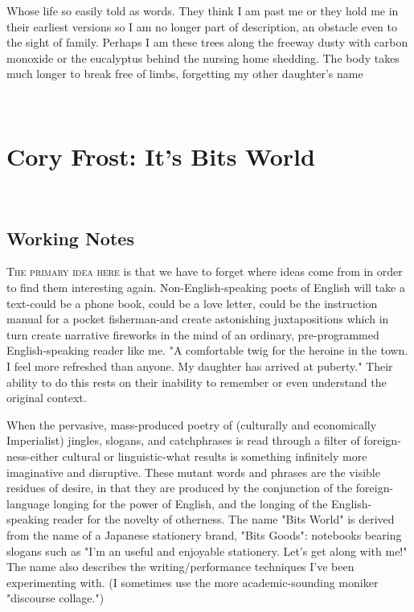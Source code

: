 \documentclass[
]{memoir}
\begin{document}
Whose life so easily told as words. They think I am past me or they hold
me in their earliest versions so I am no longer part of description, an
obstacle even to the sight of family. Perhaps I am these trees along the
freeway dusty with carbon monoxide or the eucalyptus behind the nursing
home shedding. The body takes much longer to break free of limbs,
forgetting my other daughter's name

~

\hypertarget{cory-frost-its-bits-world}{%
\chapter{Cory Frost: It's Bits World}\label{cory-frost-its-bits-world}}

~

\hypertarget{working-notes-2}{%
\section*{Working Notes}\label{working-notes-2}}

\lettrine[lines=3, findent=0em, nindent=0.1em, lhang=0]{T}{he primary idea here}
is that we have to forget where ideas come from in order to find them
interesting again. Non-English-speaking poets of English will take a
text-could be a phone book, could be a love letter, could be the
instruction manual for a pocket fisherman-and create astonishing
juxtapositions which in turn create narrative fireworks in the mind of
an ordinary, pre-programmed English-speaking reader like me. "A
comfortable twig for the heroine in the town. I feel more refreshed than
anyone. My daughter has arrived at puberty." Their ability to do this
rests on their inability to remember or even understand the original
context.

When the pervasive, mass-produced poetry of (culturally and economically
Imperialist) jingles, slogans, and catchphrases is read through a filter
of foreign-ness-either cultural or linguistic-what results is something
infinitely more imaginative and disruptive. These mutant words and
phrases are the visible residues of desire, in that they are produced by
the conjunction of the foreign-language longing for the power of
English, and the longing of the English-speaking reader for the novelty
of otherness. The name "Bits World" is derived from the name of a
Japanese stationery brand, "Bits Goods": notebooks bearing slogans such
as "I'm an useful and enjoyable stationery. Let's get along with me!"
The name also describes the writing/performance techniques I've been
experimenting with. (I sometimes use the more academic-sounding moniker
"discourse collage.")
\end{document}
